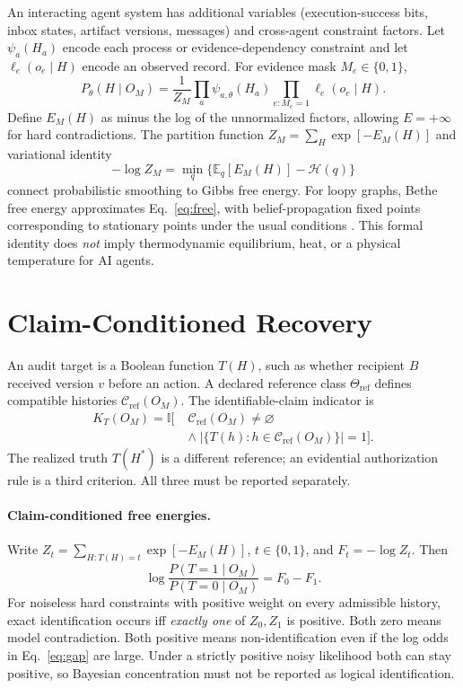 \documentclass[10pt,twocolumn]{article}
\newcommand{\calC}{\mathcal{C}}
\newcommand{\ind}{\mathbb{I}}
\begin{document}
An interacting agent system has additional variables (execution-success bits, inbox states, artifact versions, messages) and cross-agent constraint factors. Let $\psi_a(H_a)$ encode each process or evidence-dependency constraint and let $\ell_e(o_e\mid H)$ encode an observed record. For evidence mask $M_e\in\{0,1\}$,
\begin{equation}
P_{\theta}(H\mid O_M) = \frac{1}{Z_M}\prod_{a}\psi_{a,\theta}(H_a)
\prod_{e:M_e=1}\ell_e(o_e\mid H).
\label{eq:factor}
\end{equation}
Define $E_M(H)$ as minus the log of the unnormalized factors, allowing $E=+\infty$ for hard contradictions. The partition function $Z_M=\sum_H\exp[-E_M(H)]$ and variational identity
\begin{equation}
-\log Z_M=\min_{q}\Big\{\mathbb E_q[E_M(H)]-\mathcal{H}(q)\Big\}
\label{eq:free}
\end{equation}
connect probabilistic smoothing to Gibbs free energy. For loopy graphs, Bethe free energy approximates Eq.~\eqref{eq:free}, with belief-propagation fixed points corresponding to stationary points under the usual conditions \cite{yedidia2005}. This formal identity does \emph{not} imply thermodynamic equilibrium, heat, or a physical temperature for AI agents.

\section{Claim-Conditioned Recovery}
An audit target is a Boolean function $T(H)$, such as whether recipient $B$ received version $v$ before an action. A declared reference class $\Theta_{\mathrm{ref}}$ defines compatible histories $\calC_{\mathrm{ref}}(O_M)$. The identifiable-claim indicator is
\begin{equation}
\begin{aligned}
K_T(O_M)=\ind\big[\;&\calC_{\mathrm{ref}}(O_M)\neq\varnothing\\[-2pt]
&\land\;|\{T(h):h\in\calC_{\mathrm{ref}}(O_M)\}|=1\big].
\end{aligned}
\label{eq:ident}
\end{equation}
The realized truth $T(H^*)$ is a different reference; an evidential authorization rule is a third criterion. All three must be reported separately.

\paragraph{Claim-conditioned free energies.} Write $Z_t=\sum_{H:T(H)=t}\exp[-E_M(H)]$, $t\in\{0,1\}$, and $F_t=-\log Z_t$. Then
\begin{equation}
\log\frac{P(T=1\mid O_M)}{P(T=0\mid O_M)}=F_0-F_1.
\label{eq:gap}
\end{equation}
For noiseless hard constraints with positive weight on every admissible history, exact identification occurs iff \emph{exactly one} of $Z_0,Z_1$ is positive. Both zero means model contradiction. Both positive means non-identification even if the log odds in Eq.~\eqref{eq:gap} are large. Under a strictly positive noisy likelihood both can stay positive, so Bayesian concentration must not be reported as logical identification.
\end{document}
